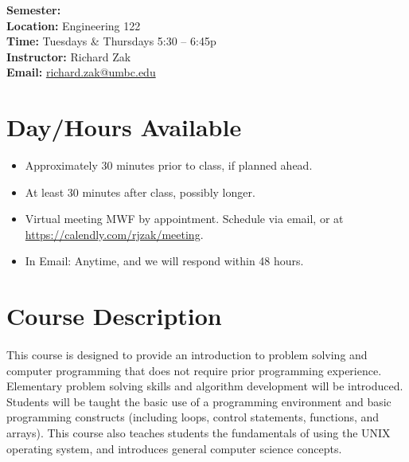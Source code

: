 \documentclass[letter,11pt]{article}
\begin{document}
\textbf{Semester:} \\
\textbf{Location:} Engineering 122 \\
\textbf{Time:} Tuesdays \& Thursdays 5:30 -- 6:45p \\
\textbf{Instructor:} Richard Zak \\
\textbf{Email:} \href{mailto:richard.zak@umbc.edu?Subject=CMSC104}{richard.zak@umbc.edu}

\section*{Day/Hours Available}
\begin{itemize}
\item Approximately 30 minutes prior to class, if planned ahead.
\item At least 30 minutes after class, possibly longer.
\item Virtual meeting MWF by appointment. Schedule via email, or at \url{https://calendly.com/rjzak/meeting}.
\item In Email: Anytime, and we will respond within 48 hours.
\end{itemize}


\section*{Course Description}
\paragraph{}This course is designed to provide an introduction to problem solving and computer programming that does not require prior programming experience. Elementary problem solving skills and algorithm development will be introduced. Students will be taught the basic use of a programming environment and basic programming constructs (including loops, control statements, functions, and arrays). This course also teaches students the fundamentals of using the UNIX operating system, and introduces general computer science concepts.
\end{document}
